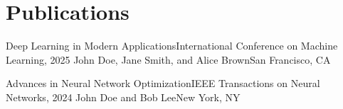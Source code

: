
\section{Publications}
\resumeSubHeadingListStart
  \resumeSubheading
    {Deep Learning in Modern Applications}{International Conference on Machine Learning, 2025}
    {John Doe, Jane Smith, and Alice Brown}{San Francisco, CA}
  \resumeItemListStart
  \resumeItemListEnd

  \resumeSubheading
    {Advances in Neural Network Optimization}{IEEE Transactions on Neural Networks, 2024}
    {John Doe and Bob Lee}{New York, NY}
  \resumeItemListStart
  \resumeItemListEnd
\resumeSubHeadingListEnd
